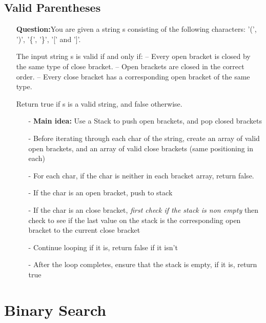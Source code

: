 \documentclass[12pt]{article}
\begin{document}
\subsection{Valid Parentheses}
\begin{enumerate}
  \item[] \textbf{Question:}You are given a string s consisting of the following characters: '(', ')', '\{', '\}', '[' and ']'.

The input string s is valid if and only if:
 -- Every open bracket is closed by the same type of close bracket.
 -- Open brackets are closed in the correct order.
 -- Every close bracket has a corresponding open bracket of the same type.

Return true if s is a valid string, and false otherwise.

    \begin{enumerate}
      \item[-] \textbf{Main idea:} Use a Stack to push open brackets, and pop closed brackets
      \item[-] Before iterating through each char of the string, create an array of valid open brackets, and an array of valid close brackets (same positioning in each) 
      \item[-] For each char, if the char is neither in each bracket array, return false. 
      \item[-] If the char is an open bracket, push to stack 
      \item[-] If the char is an close bracket, \textit{first check if the stack is non empty} then check to see if the last value on the stack is the corresponding open bracket to the current close bracket
      \item[-] Continue looping if it is, return false if it isn't
      \item[-] After the loop completes, ensure that the stack is empty, if it is, return true
        

    \end{enumerate}
\end{enumerate}

\section{Binary Search}
\end{document}

